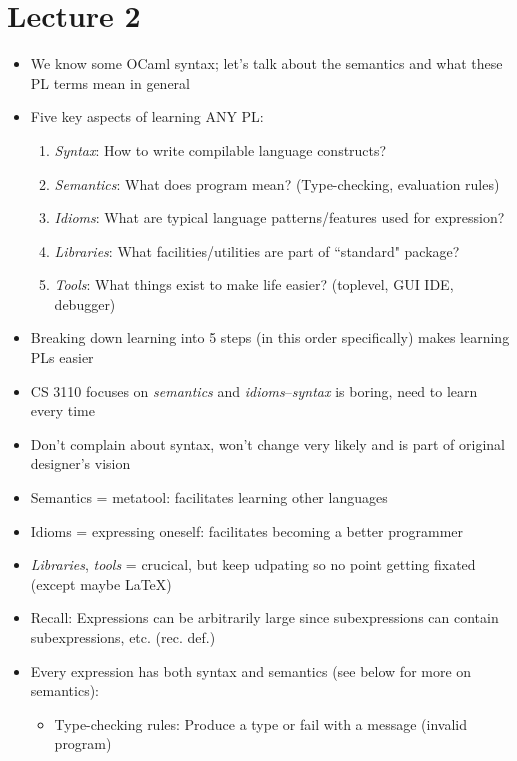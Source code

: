 \section*{Lecture 2}

\begin{itemize}
    \item We know some \textsf{OCaml} syntax; let's talk about the semantics and what these PL terms mean in general
    \item Five key aspects of learning ANY PL:
    \begin{enumerate}
        \item \textit{Syntax}: How to write compilable language constructs?
        \item \textit{Semantics}: What does program mean? (Type-checking, evaluation rules)
        \item \textit{Idioms}: What are typical language patterns/features used for expression?
        \item \textit{Libraries}: What facilities/utilities are part of ``standard" package?
        \item \textit{Tools}: What things exist to make life easier? (toplevel, GUI IDE, debugger)
    \end{enumerate}
    \item Breaking down learning into 5 steps (in this order specifically) makes learning PLs easier
    \item CS 3110 focuses on \textit{semantics} and \textit{idioms}--\textit{syntax} is boring, need to learn every time
    \item Don't complain about syntax, won't change very likely and is part of original designer's vision
    \item Semantics = metatool: facilitates learning other languages
    \item Idioms = expressing oneself: facilitates becoming a better programmer
    \item \textit{Libraries}, \textit{tools} = crucical, but keep udpating so no point getting fixated (except maybe \LaTeX)
    \item Recall: Expressions can be arbitrarily large since subexpressions can contain subexpressions, etc. (rec. def.)
    \item Every expression has both syntax and semantics (see below for more on semantics):
    \begin{itemize}
        \item Type-checking rules: Produce a type or fail with a message (invalid program)

\end{itemize}
\end{itemize}
